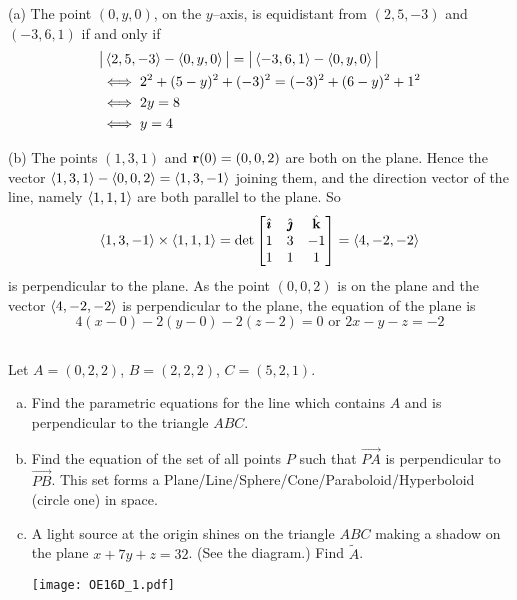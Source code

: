 \begin{solution}
(a) 
The point $(0,y,0)$, on the $y$--axis, is equidistant from 
                $(2, 5, -3)$ and $(-3, 6, 1)$ if and only if
\begin{align*}
&\big|\left< 2, 5, -3\right>-\left< 0,y,0\right>\big|
         =\big|\left< -3, 6, 1\right>-\left< 0,y,0\right>\big| \\
&\iff 2^2+(5-y)^2+(-3)^2=(-3)^2+(6-y)^2+1^2 \\
&\iff 2y=8 \\
&\iff y=4
\end{align*}

(b) 
The points $(1,3,1)$ and $\mathbf{r}(0)=(0,0,2)$ are both on the plane.
Hence the vector $\left< 1,3,1\right>-\left< 0,0,2\right>=\left< 1,3,-1\right>$ 
joining them,
and the direction vector of the line, namely $\left< 1,1,1\right>$ are 
both parallel to the plane. So 
\begin{equation*}
\left< 1,3,-1\right>\times \left< 1,1,1\right>
=\det\left[\begin{matrix} \hat{\pmb{\imath}} &\hat{\pmb{\jmath}} &\hat{\mathbf{k}} \\ 
                           1&3&-1 \\ 
                           1&1&1 \end{matrix}\right]
= \left< 4,-2,-2\right>
\end{equation*}
is perpendicular to the plane. As the point $(0,0,2)$ is on the plane
and the vector  $\left< 4,-2,-2\right>$ is perpendicular to the plane, the
equation of the plane is
\begin{equation*}
4(x-0)-2(y-0)-2(z-2)=0\text{ or } 2x-y-z=-2
\end{equation*}
\end{solution}


\subsection*{\Application}


\begin{question}[M200 2016D] %
Let $A=(0,2,2)$, $B=(2,2,2)$, $C=(5,2,1)$.
\begin{enumerate}[(a)]
\item
Find the parametric equations for the line which contains $A$
and is perpendicular to the triangle $ABC$.
\item
Find the equation of the set of all points $P$ such that $\overrightarrow{PA}$
is perpendicular to $\overrightarrow{PB}$. This set forms a
Plane/Line/Sphere/Cone/Paraboloid/Hyperboloid (circle one) in
space.
\item
A light source at the origin shines on the triangle $ABC$ making
a shadow on the plane $x+7y+z=32$. (See the diagram.) Find $\tilde A$.

\begin{center}
     \texttt{[image: OE16D\_1.pdf]}
\end{center}


\end{enumerate}
\end{question}

